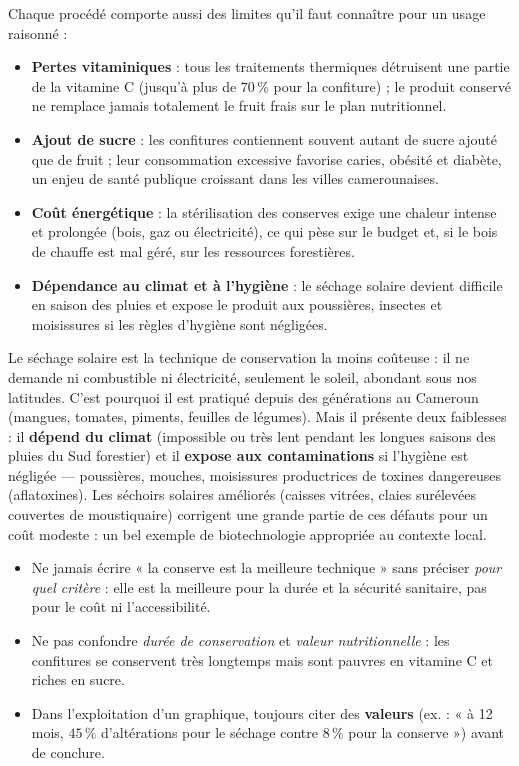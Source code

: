 \documentclass[11pt]{article}
\newcommand{\cle}[1]{{\popxbold\color{popdark}#1}}
\begin{document}
Chaque procédé comporte aussi des \cle{limites} qu'il faut connaître pour un usage raisonné :

\begin{itemize}
\item \textbf{Pertes vitaminiques} : tous les traitements thermiques détruisent une partie de la vitamine C (jusqu'à plus de $70\,\%$ pour la confiture) ; le produit conservé ne remplace jamais totalement le fruit frais sur le plan nutritionnel.
\item \textbf{Ajout de sucre} : les confitures contiennent souvent autant de sucre ajouté que de fruit ; leur consommation excessive favorise caries, obésité et diabète, un enjeu de santé publique croissant dans les villes camerounaises.
\item \textbf{Coût énergétique} : la stérilisation des conserves exige une chaleur intense et prolongée (bois, gaz ou électricité), ce qui pèse sur le budget et, si le bois de chauffe est mal géré, sur les ressources forestières.
\item \textbf{Dépendance au climat et à l'hygiène} : le séchage solaire devient difficile en saison des pluies et expose le produit aux poussières, insectes et moisissures si les règles d'hygiène sont négligées.
\end{itemize}

\begin{savaistu}
Le \cle{séchage solaire} est la technique de conservation la moins coûteuse : il ne demande ni combustible ni électricité, seulement le soleil, abondant sous nos latitudes. C'est pourquoi il est pratiqué depuis des générations au Cameroun (mangues, tomates, piments, feuilles de légumes). Mais il présente deux faiblesses : il \textbf{dépend du climat} (impossible ou très lent pendant les longues saisons des pluies du Sud forestier) et il \textbf{expose aux contaminations} si l'hygiène est négligée — poussières, mouches, moisissures productrices de toxines dangereuses (aflatoxines). Les séchoirs solaires améliorés (caisses vitrées, claies surélevées couvertes de moustiquaire) corrigent une grande partie de ces défauts pour un coût modeste : un bel exemple de biotechnologie appropriée au contexte local.
\end{savaistu}

\begin{attention}
\begin{itemize}
\item Ne jamais écrire « la conserve est la meilleure technique » sans préciser \emph{pour quel critère} : elle est la meilleure pour la durée et la sécurité sanitaire, pas pour le coût ni l'accessibilité.
\item Ne pas confondre \emph{durée de conservation} et \emph{valeur nutritionnelle} : les confitures se conservent très longtemps mais sont pauvres en vitamine C et riches en sucre.
\item Dans l'exploitation d'un graphique, toujours citer des \textbf{valeurs} (ex. : « à 12 mois, $45\,\%$ d'altérations pour le séchage contre $8\,\%$ pour la conserve ») avant de conclure.
\end{itemize}
\end{attention}
\end{document}
